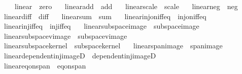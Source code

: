 \begin{isabellebody}
{}\isanewline
\ \ \ \ \ \ linear{\isacharunderscore}{\kern0pt}{}\ {\isacharequal}{\kern0pt}\ zero\isanewline
\ \ \ linear{\isacharunderscore}{\kern0pt}add\ {\isacharequal}{\kern0pt}\ add\isanewline
\ \ \ linear{\isacharunderscore}{\kern0pt}scale\ {\isacharequal}{\kern0pt}\ scale\isanewline
\ \ \ linear{\isacharunderscore}{\kern0pt}neg\ {\isacharequal}{\kern0pt}\ neg\isanewline
\ \ \ linear{\isacharunderscore}{\kern0pt}diff\ {\isacharequal}{\kern0pt}\ diff\isanewline
\ \ \ linear{\isacharunderscore}{\kern0pt}sum\ {\isacharequal}{\kern0pt}\ sum\isanewline
\ \ \ linear{\isacharunderscore}{\kern0pt}inj{\isacharunderscore}{\kern0pt}on{\isacharunderscore}{\kern0pt}iff{\isacharunderscore}{\kern0pt}eq{\isacharunderscore}{\kern0pt}{}\ {\isacharequal}{\kern0pt}\ inj{\isacharunderscore}{\kern0pt}on{\isacharunderscore}{\kern0pt}iff{\isacharunderscore}{\kern0pt}eq{\isacharunderscore}{\kern0pt}{}\isanewline
\ \ \ linear{\isacharunderscore}{\kern0pt}inj{\isacharunderscore}{\kern0pt}iff{\isacharunderscore}{\kern0pt}eq{\isacharunderscore}{\kern0pt}{}\ {\isacharequal}{\kern0pt}\ inj{\isacharunderscore}{\kern0pt}iff{\isacharunderscore}{\kern0pt}eq{\isacharunderscore}{\kern0pt}{}\isanewline
\ \ \ linear{\isacharunderscore}{\kern0pt}subspace{\isacharunderscore}{\kern0pt}image\ {\isacharequal}{\kern0pt}\ subspace{\isacharunderscore}{\kern0pt}image\isanewline
\ \ \ linear{\isacharunderscore}{\kern0pt}subspace{\isacharunderscore}{\kern0pt}vimage\ {\isacharequal}{\kern0pt}\ subspace{\isacharunderscore}{\kern0pt}vimage\isanewline
\ \ \ linear{\isacharunderscore}{\kern0pt}subspace{\isacharunderscore}{\kern0pt}kernel\ {\isacharequal}{\kern0pt}\ subspace{\isacharunderscore}{\kern0pt}kernel\isanewline
\ \ \ linear{\isacharunderscore}{\kern0pt}span{\isacharunderscore}{\kern0pt}image\ {\isacharequal}{\kern0pt}\ span{\isacharunderscore}{\kern0pt}image\isanewline
\ \ \ linear{\isacharunderscore}{\kern0pt}dependent{\isacharunderscore}{\kern0pt}inj{\isacharunderscore}{\kern0pt}imageD\ {\isacharequal}{\kern0pt}\ dependent{\isacharunderscore}{\kern0pt}inj{\isacharunderscore}{\kern0pt}imageD\isanewline
\ \ \ linear{\isacharunderscore}{\kern0pt}eq{\isacharunderscore}{\kern0pt}{}{\isacharunderscore}{\kern0pt}on{\isacharunderscore}{\kern0pt}span\ {\isacharequal}{\kern0pt}\ eq{\isacharunderscore}{\kern0pt}{}{\isacharunderscore}{\kern0pt}on{\isacharunderscore}{\kern0pt}span\isanewline

\end{isabellebody}
